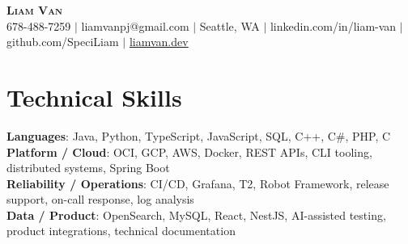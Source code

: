 \documentclass[letterpaper,11pt]{article}
\begin{document}

%
\begin{center}
    \textbf{\Huge \scshape Liam Van} \\ \vspace{1pt}
    \small 678-488-7259 $|$ \small {liamvanpj@gmail.com} $|$ Seattle, WA
 {{$|$ linkedin.com/in/liam-van} {$|$ github.com/SpeciLiam} {$|$ \href{https://liamvan.dev}{liamvan.dev}}}

\end{center}

\section{Technical Skills}
 \begin{itemize}[leftmargin=0.15in, label={}]
    \small{\item{
     \textbf{Languages}{: Java, Python, TypeScript, JavaScript, SQL, C++, C\#, PHP, C} \\
     \textbf{Platform / Cloud}{: OCI, GCP, AWS, Docker, REST APIs, CLI tooling, distributed systems, Spring Boot} \\
     \textbf{Reliability / Operations}{: CI/CD, Grafana, T2, Robot Framework, release support, on-call response, log analysis} \\
     \textbf{Data / Product}{: OpenSearch, MySQL, React, NestJS, AI-assisted testing, product integrations, technical documentation} \\
    }}
 \end{itemize}
%

\end{document}
